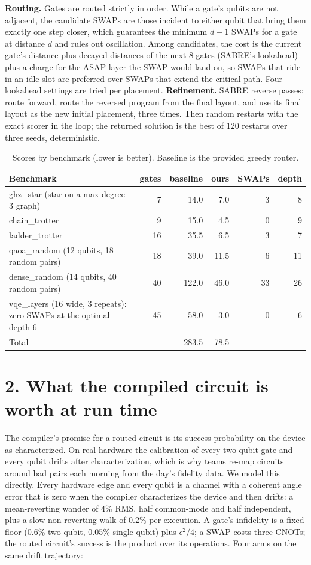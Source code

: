 \documentclass[10pt,letterpaper]{article}
\begin{document}
\textbf{Routing.} Gates are routed strictly in order. While a gate's qubits are not adjacent, the candidate SWAPs are those incident to either qubit that bring them exactly one step closer, which guarantees the minimum $d{-}1$ SWAPs for a gate at distance $d$ and rules out oscillation. Among candidates, the cost is the current gate's distance plus decayed distances of the next 8 gates (SABRE's lookahead) plus a charge for the ASAP layer the SWAP would land on, so SWAPs that ride in an idle slot are preferred over SWAPs that extend the critical path. Four lookahead settings are tried per placement. \textbf{Refinement.} SABRE reverse passes: route forward, route the reversed program from the final layout, and use its final layout as the new initial placement, three times. Then random restarts with the exact scorer in the loop; the returned solution is the best of 120 restarts over three seeds, deterministic.

\begin{table}[h]\caption{Scores by benchmark (lower is better). Baseline is the provided greedy router.}
\small\begin{tabularx}{\textwidth}{Y r r r r r}\toprule
Benchmark & gates & baseline & ours & SWAPs & depth\\\midrule
ghz\_star (star on a max-degree-3 graph) & 7 & 14.0 & 7.0 & 3 & 8\\
chain\_trotter & 9 & 15.0 & 4.5 & 0 & 9\\
ladder\_trotter & 16 & 35.5 & 6.5 & 3 & 7\\
qaoa\_random (12 qubits, 18 random pairs) & 18 & 39.0 & 11.5 & 6 & 11\\
dense\_random (14 qubits, 40 random pairs) & 40 & 122.0 & 46.0 & 33 & 26\\
vqe\_layers (16 wide, 3 repeats): zero SWAPs at the optimal depth 6 & 45 & 58.0 & 3.0 & 0 & 6\\\midrule
Total & & 283.5 & 78.5 & & \\
\bottomrule\end{tabularx}\end{table}

\section*{2. What the compiled circuit is worth at run time}
The compiler's promise for a routed circuit is its success probability on the device as characterized. On real hardware the calibration of every two-qubit gate and every qubit drifts after characterization, which is why teams re-map circuits around bad pairs each morning from the day's fidelity data. We model this directly. Every hardware edge and every qubit is a channel with a coherent angle error that is zero when the compiler characterizes the device and then drifts: a mean-reverting wander of 4\% RMS, half common-mode and half independent, plus a slow non-reverting walk of 0.2\% per execution. A gate's infidelity is a fixed floor (0.6\% two-qubit, 0.05\% single-qubit) plus $\epsilon^2/4$; a SWAP costs three CNOTs; the routed circuit's success is the product over its operations. Four arms on the same drift trajectory:
\end{document}
